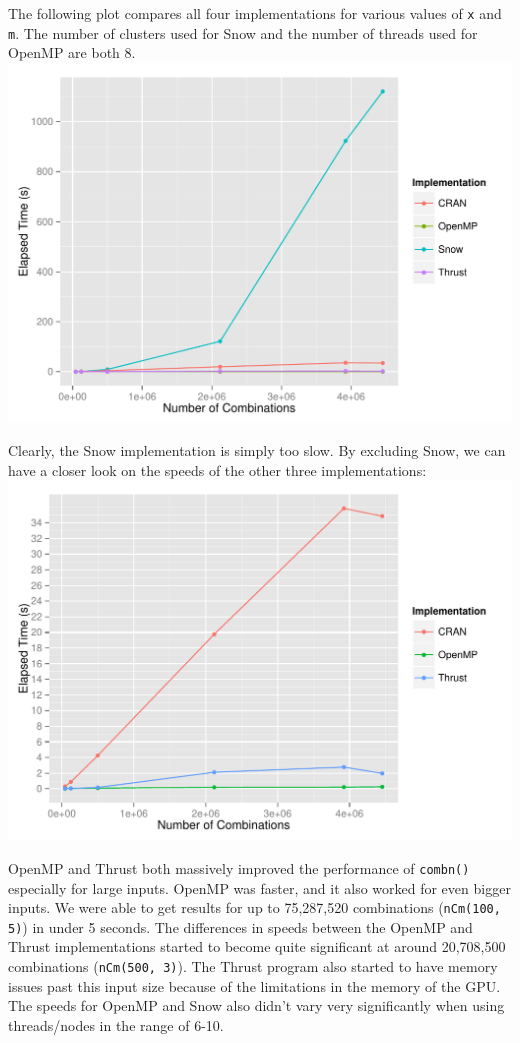 The following plot compares all four implementations for various values of \texttt{x} and \texttt{m}. The number of clusters used for Snow and the number of threads used for OpenMP are both 8.\\

\includegraphics{all.pdf}\\
\null

Clearly, the Snow implementation is simply too slow. By excluding Snow, we can have a closer look on the speeds of the other three implementations:\\

\includegraphics{withoutsnow.pdf}\\
\null

OpenMP and Thrust both massively improved the performance of \texttt{combn()} especially for large inputs. OpenMP was faster, and it also worked for even bigger inputs. We were able to get results for up to 75,287,520 combinations (\texttt{nCm(100, 5)}) in under 5 seconds. The differences in speeds between the OpenMP and Thrust implementations started to become quite significant at around 20,708,500 combinations (\texttt{nCm(500, 3)}). The Thrust program also started to have memory issues past this input size because of the limitations in the memory of the GPU. The speeds for OpenMP and Snow also didn't vary very significantly when using threads/nodes in the range of 6-10.\\
\null


